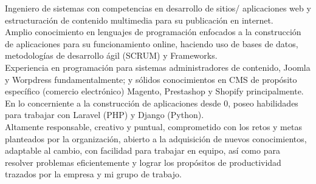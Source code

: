 

\begin{cvparagraph}

Ingeniero de sistemas con competencias en desarrollo de sitios/ aplicaciones web y estructuración de contenido multimedia para su publicación en internet.
\\[1\baselineskip]Amplio conocimiento en lenguajes de programación enfocados a la construcción de aplicaciones para su funcionamiento online, haciendo uso de bases de datos, metodologías de desarrollo ágil (SCRUM) y Frameworks.
\\[1\baselineskip]Experiencia en programación para sistemas administradores de contenido, Joomla y Worpdress fundamentalmente; y sólidos conocimientos en CMS de propósito específico (comercio electrónico) Magento, Prestashop y Shopify principalmente. 
\\[1\baselineskip]En lo concerniente a la construcción de aplicaciones desde 0, poseo habilidades para trabajar con Laravel (PHP) y Django (Python).
\\[1\baselineskip]Altamente responsable, creativo y puntual, comprometido con los retos y metas planteados por la organización, abierto a la adquisición de nuevos conocimientos, adaptable al cambio, con facilidad para trabajar en equipo, así como para resolver problemas eficientemente y lograr los propósitos de productividad trazados por la empresa y mi grupo de trabajo.
\end{cvparagraph}
